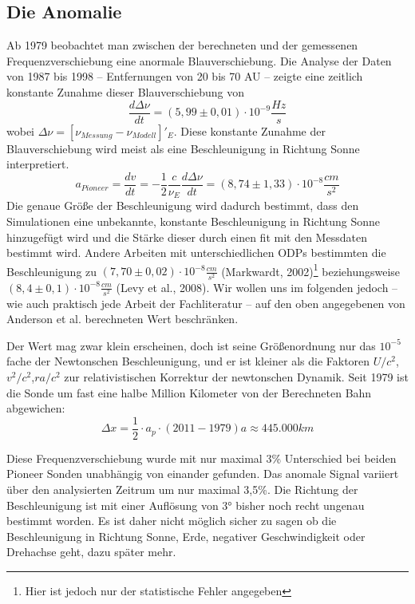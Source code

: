 
\subsection{Die Anomalie}
Ab 1979 beobachtet man zwischen der berechneten und der gemessenen Frequenzverschiebung eine anormale Blauverschiebung.
Die Analyse der Daten von 1987 bis 1998 – Entfernungen von 20 bis 70 AU – zeigte eine zeitlich konstante Zunahme dieser
Blauverschiebung von
\begin{equation}
  \frac{d\Delta\nu}{dt}=(5,99\pm0,01)\cdot10^{-9}\frac{Hz}{s}
\end{equation}
wobei $\Delta\nu=[\nu_{Messung}-\nu_{Modell}]'_E$. Diese konstante Zunahme der Blauverschiebung wird meist als eine
Beschleunigung in Richtung Sonne interpretiert.
\begin{equation}
  a_{Pioneer}=\frac{dv}{dt}=-\frac{1}{2}\frac{c}{\nu_E}\frac{d\Delta\nu}{dt} = (8,74\pm1,33)\cdot10^{-8}\frac{cm}{s^2}
\end{equation}
Die genaue Größe der Beschleunigung wird dadurch bestimmt, dass den Simulationen eine unbekannte, konstante Beschleunigung in Richtung Sonne hinzugefügt wird und die Stärke dieser durch einen fit
mit den Messdaten bestimmt wird.	%
Andere Arbeiten mit unterschiedlichen ODPs bestimmten die Beschleunigung zu $(7,70
\pm0,02)\cdot10^{-8}\frac{cm}{s^2}$ (Markwardt,
2002)\footnote{Hier ist jedoch nur der statistische Fehler angegeben}\cite{Markwardt2002} beziehungsweise
$(8,4\pm0,1)\cdot10^{-8}\frac{cm}{s^2}$ (Levy et al., 2008)\cite{Levy2008}.
Wir wollen uns im folgenden jedoch – wie auch praktisch jede Arbeit der Fachliteratur – auf den oben angegebenen von
Anderson et al. berechneten Wert beschränken.

Der Wert mag zwar klein erscheinen, doch ist seine Größenordnung nur das $10^{-5}$ fache der Newtonschen Beschleunigung,
und er ist kleiner als die Faktoren $U/c^2$,$v^2/c^2$,$r a/c^2$ zur relativistischen Korrektur der newtonschen Dynamik.
Seit 1979 ist die Sonde um fast eine halbe Million Kilometer von der Berechneten Bahn abgewichen:
\begin{equation}
  \Delta x= \frac12 \cdot a_p \cdot (2011-1979) a\approx 445.000 km
\end{equation}

Diese Frequenzverschiebung wurde mit nur maximal 3\% Unterschied bei beiden Pioneer Sonden unabhängig von einander
gefunden. Das anomale Signal variiert über den analysierten Zeitrum um nur maximal 3,5\%. Die Richtung der
Beschleunigung ist mit einer Auflösung von 3° bisher noch recht ungenau bestimmt worden. Es ist daher nicht möglich
sicher zu sagen ob die Beschleunigung
in Richtung Sonne, Erde, negativer Geschwindigkeit oder Drehachse geht, dazu später mehr.
